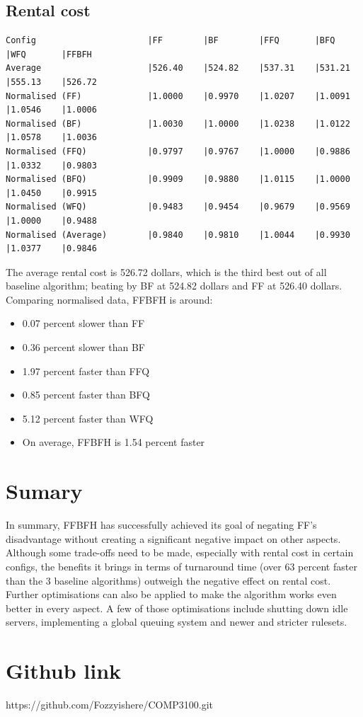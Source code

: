 \documentclass[a4paper]{article} %
\begin{document}
\subsection{Rental cost}
\begin{lstlisting}
Config                      |FF        |BF        |FFQ       |BFQ       |WFQ       |FFBFH
Average                     |526.40    |524.82    |537.31    |531.21    |555.13    |526.72    
Normalised (FF)             |1.0000    |0.9970    |1.0207    |1.0091    |1.0546    |1.0006    
Normalised (BF)             |1.0030    |1.0000    |1.0238    |1.0122    |1.0578    |1.0036    
Normalised (FFQ)            |0.9797    |0.9767    |1.0000    |0.9886    |1.0332    |0.9803    
Normalised (BFQ)            |0.9909    |0.9880    |1.0115    |1.0000    |1.0450    |0.9915    
Normalised (WFQ)            |0.9483    |0.9454    |0.9679    |0.9569    |1.0000    |0.9488    
Normalised (Average)        |0.9840    |0.9810    |1.0044    |0.9930    |1.0377    |0.9846    
\end{lstlisting}
The average rental cost is 526.72 dollars, which is the third best out of all baseline algorithm; beating by BF at 524.82 dollars and FF at 526.40 dollars. Comparing normalised data, FFBFH is around:
\begin{itemize}
    \item 0.07 percent slower than FF
    \item 0.36 percent slower than BF
    \item 1.97 percent faster than FFQ
    \item 0.85 percent faster than BFQ
    \item 5.12 percent faster than WFQ
    \item On average, FFBFH is 1.54 percent faster
\end{itemize}
\section{Sumary}
\label{sec:section5}
In summary, FFBFH has successfully achieved its goal of negating FF's disadvantage without creating a significant negative impact on other aspects. Although some trade-offs need to be made, especially with rental cost in certain configs, the benefits it brings in terms of turnaround time (over 63 percent faster than the 3 baseline algorithms) outweigh the negative effect on rental cost.\\
Further optimisations can also be applied to make the algorithm works even better in every aspect. A few of those optimisations include shutting down idle servers, implementing a global queuing system and newer and stricter rulesets.
\section{Github link}
https://github.com/Fozzyishere/COMP3100.git


\bibitem[]{}
\end{document}
